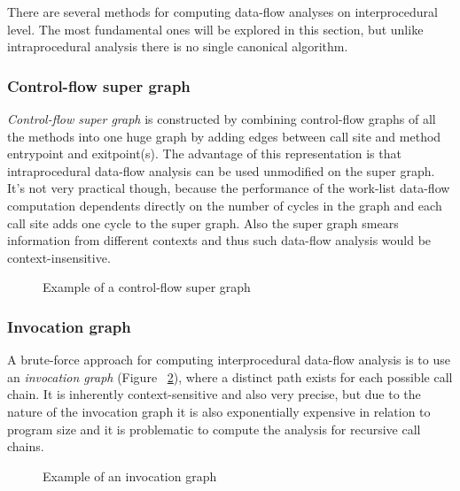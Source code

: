 There are several methods for computing data-flow analyses on interprocedural level. The most fundamental ones will be explored in this section, but unlike intraprocedural analysis there is no single canonical algorithm.

\subsubsection{Control-flow super graph}

\emph{Control-flow super graph} is constructed by combining control-flow graphs of all the methods into one huge graph by adding edges between call site and method entrypoint and exitpoint(s). The advantage of this representation is that intraprocedural data-flow analysis can be used unmodified on the super graph. It's not very practical though, because the performance of the work-list data-flow computation dependents directly on the number of cycles in the graph and each call site adds one cycle to the super graph. Also the super graph smears information from different contexts and thus such data-flow analysis would be context-insensitive.

\begin{figure}
\begin{center}
\caption{Example of a control-flow super graph}
\label{fig:controlFlowSupergraph}
\end{center}
\end{figure}

\subsubsection{Invocation graph}

A brute-force approach for computing interprocedural data-flow analysis is to use an \emph{invocation graph} (Figure ~\ref{fig:invocationGraph}), where a distinct path exists for each possible call chain. It is inherently context-sensitive and also very precise, but due to the nature of the invocation graph it is also exponentially expensive in relation to program size and it is problematic to compute the analysis for recursive call chains. 

\begin{figure}
\begin{center}
\caption{Example of an invocation graph}
\label{fig:invocationGraph}
\end{center}
\end{figure}

